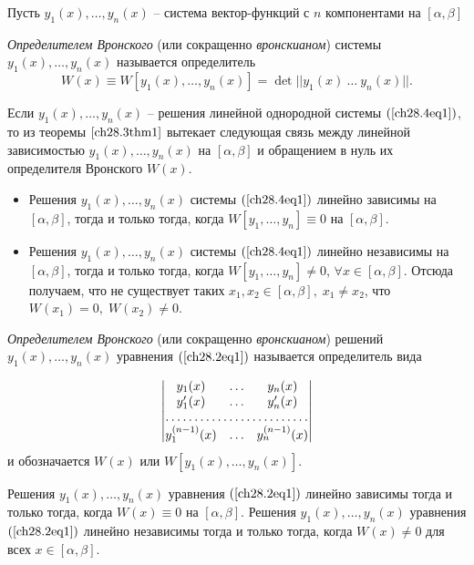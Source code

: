 Пусть $y_1(x), \ldots, y_n(x)$ -- система вектор-функций с $n$ компонентами на $[\alpha, \beta]$
\begin{defn}
\textit{Определителем Вронского} (или сокращенно \textit{вронскианом}) системы $y_1(x), \ldots, y_n(x)$ называется определитель
$$
W(x) \equiv W[y_1(x), \ldots, y_n(x)] = \det ||y_1(x)\ \ldots\ y_n(x)||.
$$

Если $y_1(x), \ldots, y_n(x)$ -- решения линейной однородной системы $(\ref{ch28.4eq1})$, то из теоремы $\ref{ch28.3thm1}$ вытекает следующая связь между линейной зависимостью $y_1(x), \ldots, y_n(x)$ на $[\alpha, \beta]$ и обращением в нуль их определителя Вронского $W(x)$.

\begin{itemize}
\item
Решения $y_1(x), \ldots, y_n(x)$ системы $(\ref{ch28.4eq1})$ линейно зависимы на $[\alpha, \beta]$, тогда и только тогда, когда $W[y_1, \ldots, y_n] \equiv 0$ на $[\alpha, \beta]$.
\item
Решения $y_1(x), \ldots, y_n(x)$ системы $(\ref{ch28.4eq1})$ линейно независимы на $[\alpha, \beta]$, тогда и только тогда, когда $W[y_1, \ldots, y_n] \not = 0$, $\forall x \in [\alpha, \beta]$. Отсюда получаем, что не существует таких $x_1, x_2 \in [\alpha, \beta], \; x_1 \not= x_2$, что $W(x_1) = 0, \; W(x_2) \not= 0$. 
\end{itemize}
\end{defn}

\begin{defn}
\textit{Определителем Вронского} (или сокращенно \textit{вронскианом}) решений $y_1(x), \ldots, y_n(x)$ уравнения $(\ref{ch28.2eq1})$ называется определитель вида

\begin{equation}
\begin{vmatrix}
y_1(x) & \ldots & y_n(x) \\
y'_1(x) & \ldots & y'_n(x) \\
\hdotsfor{3} \\
y^{(n - 1)}_1(x) & \ldots & y^{(n - 1)}_n(x)
\end{vmatrix}
\end{equation}
и обозначается $W(x)$ или $W[y_1(x), \ldots, y_n(x)]$.
\end{defn}

\begin{thm} \label{ch28.3thm3}
Решения $y_1(x), \ldots, y_n(x)$ уравнения $(\ref{ch28.2eq1})$ линейно зависимы тогда и только тогда, когда $W(x) \equiv 0$ на $[\alpha, \beta]$. Решения $y_1(x), \ldots, y_n(x)$ уравнения $(\ref{ch28.2eq1})$ линейно независимы тогда и только тогда, когда $W(x) \not= 0$ для всех $x \in [\alpha, \beta]$.
\end{thm}

